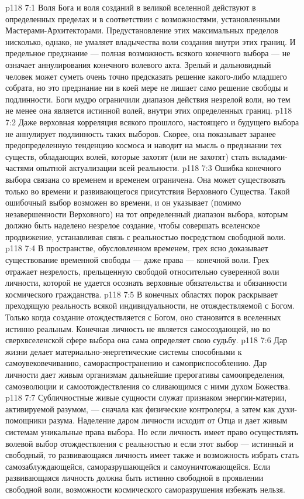 \vs p118 7:1 Воля Бога и воля созданий в великой вселенной действуют в определенных пределах и в соответствии с возможностями, установленными Мастерами\hyp{}Архитекторами. Предустановление этих максимальных пределов нисколько, однако, не умаляет владычества воли создания внутри этих границ. И предельное предзнание --- полная возможность всякого конечного выбора --- не означает аннулирования конечного волевого акта. Зрелый и дальновидный человек может суметь очень точно предсказать решение какого\hyp{}либо младшего собрата, но это предзнание ни в коей мере не лишает само решение свободы и подлинности. Боги мудро ограничили диапазон действия незрелой воли, но тем не менее она является истинной волей, внутри этих определенных границ.
\vs p118 7:2 Даже верховная корреляция всякого прошлого, настоящего и будущего выбора не аннулирует подлинность таких выборов. Скорее, она показывает заранее предопределенную тенденцию космоса и наводит на мысль о предзнании тех существ, обладающих волей, которые захотят (или не захотят) стать вкладами\hyp{}частями опытной актуализации всей реальности.
\vs p118 7:3 \pc Ошибка конечного выбора связана со временем и временем ограничена. Она может существовать только во времени и  развивающегося присутствия Верховного Существа. Такой ошибочный выбор возможен во времени, и он указывает (помимо незавершенности Верховного) на тот определенный диапазон выбора, которым должно быть наделено незрелое создание, чтобы совершать вселенское продвижение, устанавливая связь с реальностью посредством свободной воли.
\vs p118 7:4 В пространстве, обусловленном временем, грех ясно доказывает существование временной свободы --- даже права --- конечной воли. Грех отражает незрелость, прельщенную свободой относительно суверенной воли личности, которой не удается осознать верховные обязательства и обязанности космического гражданства.
\vs p118 7:5 В конечных областях порок раскрывает преходящую реальность всякой индивидуальности, не отождествляемой с Богом. Только когда создание отождествляется с Богом, оно становится в вселенных истинно реальным. Конечная личность не является самосоздающей, но во сверхвселенской сфере выбора она сама определяет свою судьбу.
\vs p118 7:6 \pc Дар жизни делает материально\hyp{}энергетические системы способными к самоувековечиванию, самораспространению и самоприспособлению. Дар личности дает живым организмам дальнейшие прерогативы самоопределения, самоэволюции и самоотождествления со сливающимся с ними духом Божества.
\vs p118 7:7 Субличностные живые сущности служат признаком энергии\hyp{}материи, активируемой разумом, --- сначала как физические контролеры, а затем как духи\hyp{}помощники разума. Наделение даром личности исходит от Отца и дает живым системам уникальные права выбора. Но если личность имеет право осуществлять волевой выбор отождествления с реальностью и если этот выбор --- истинный и свободный, то развивающаяся личность имеет также и возможность избрать стать самозаблуждающейся, саморазрушающейся и самоуничтожающейся. Если развивающаяся личность должна быть истинно свободной в проявлении свободной воли, возможности космического саморазрушения избежать нельзя.
